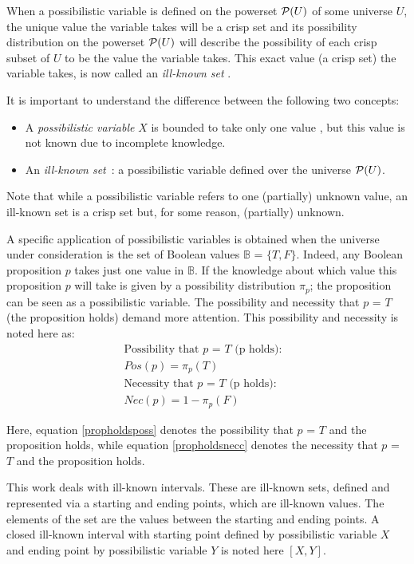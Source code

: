 When a possibilistic variable is defined on the powerset $\mathcal{P}(U)$ of some universe $U$, the unique value the variable takes will be a crisp set and its possibility distribution on the powerset $\mathcal{P}(U)$ will describe the possibility of each crisp subset of $U$ to be the value the variable takes. This exact value (a crisp set) the variable takes, is now called an \emph{ill-known set} \cite{Dubois1988a}.

It is important to understand the difference between the following two concepts:
\begin{itemize}
\item
A \emph{possibilistic variable} $X$ is bounded to take only one value , but this value is not known due to incomplete knowledge. 
\item
An \emph{ill-known set}~\cite{Dubois1988a}: a possibilistic variable defined over the universe $\mathcal{P}(U)$.
\end{itemize}

Note that while a possibilistic variable refers to one (partially) unknown value, an ill-known set is a crisp set but, for some reason, (partially) unknown.

A specific application of possibilistic variables is obtained when the universe under consideration is the set of Boolean values $\mathbb{B}$ = $\{T,F\}$. Indeed, any Boolean proposition $p$ takes just one value in $\mathbb{B}$. If the knowledge about which value this proposition $p$ will take is given by a possibility distribution $\pi_p$; the proposition can be seen as a possibilistic variable. The possibility and necessity that $p$ = $T$ (the proposition holds) demand more attention. This possibility and necessity is noted here as:
\begin{align}
\label{propholdsposs}
\text{Possibility that $p$ = $T$ (p holds):} &\\
\nonumber
Pos(p) = \pi_p(T)  \\
\label{propholdsnecc}
\text{Necessity that $p$ = $T$ (p holds):} & \\
\nonumber
Nec(p) = 1-\pi_p(F) 
\end{align}

Here, equation \eqref{propholdsposs} denotes the possibility that $p$ = $T$ and the proposition holds, while equation \eqref{propholdsnecc} denotes the necessity that $p$ = $T$ and the proposition holds.

This work deals with ill-known intervals. These are ill-known sets, defined and represented via a starting and ending points, which are ill-known values. The elements of the set are the values between the starting and ending points. A closed ill-known interval with starting point defined by possibilistic variable $X$ and ending point by possibilistic variable $Y$ is noted here $\left[X, Y\right]$. %

